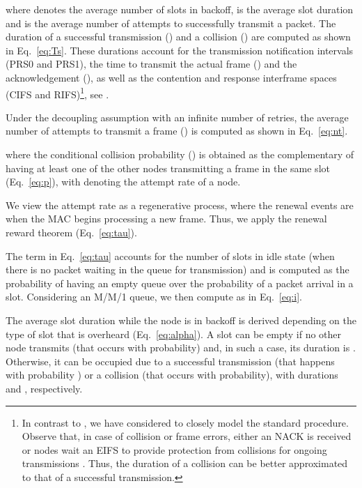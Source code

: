 \documentclass[preprint,12pt]{elsarticle}
\begin{document}
where  denotes the average number of slots in backoff,  is the average slot duration and  is the average number of attempts to successfully transmit a packet. The duration of a successful transmission () and a collision () are computed as shown in Eq.~\ref{eq:Ts}. These durations account for the transmission notification intervals (PRS0 and PRS1), the time to transmit the actual frame () and the acknowledgement (), as well as the contention and response interframe spaces (CIFS and RIFS)\footnote{In contrast to \cite{chung2006performance}, we have considered  to closely model the standard procedure. Observe that, in case of collision or frame errors, either an NACK is received or nodes wait an EIFS to provide protection from collisions for ongoing transmissions \cite{HomeplugStd}. Thus, the duration of a collision can be better approximated to that of a successful transmission.}, see \cite{HomeplugStd}.



Under the decoupling assumption with an infinite number of retries, the average number of attempts to transmit a frame () is computed as shown in Eq.~\ref{eq:nt}.



where the conditional collision probability () is obtained as the complementary of having at least one of the other  nodes transmitting a frame in the same slot (Eq.~\ref{eq:p}), with  denoting the attempt rate of a node. 



We view the attempt rate as a regenerative process, where the renewal events are when the MAC begins processing a new frame. Thus, we apply the renewal reward theorem (Eq.~\ref{eq:tau}). 



The term  in Eq.~\ref{eq:tau} accounts for the number of slots in idle state (when there is no packet waiting in the queue for transmission) and is computed as the probability of having an empty queue over the probability of a packet arrival in a slot. Considering an M/M/1 queue, we then compute  as in Eq.~\ref{eq:i}. 




The average slot duration while the node is in backoff is derived depending on the type of slot that is overheard (Eq.~\ref{eq:alpha}). A slot can be empty if no other node transmits (that occurs with  probability) and, in such a case, its duration is . Otherwise, it can be occupied due to a successful transmission (that happens with probability ) or a collision (that occurs with  probability), with durations  and , respectively. 
\end{document}
